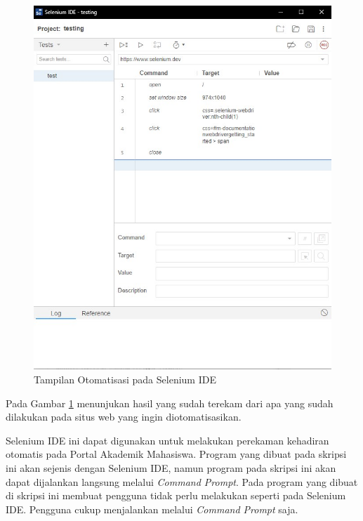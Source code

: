 \begin{enumerate}
\begin{figure}[H]
			\includegraphics[scale=0.5]{Gambar/testing.jpg}
			\caption{Tampilan Otomatisasi pada Selenium IDE} 
			\label{fig:testing}
		\end{figure}
		Pada Gambar \ref{fig:testing} menunjukan hasil yang sudah terekam dari apa yang sudah dilakukan pada situs web yang ingin diotomatisasikan.
	\end{enumerate}
Selenium IDE ini dapat digunakan untuk melakukan perekaman kehadiran otomatis pada Portal Akademik Mahasiswa. Program yang dibuat pada skripsi ini akan sejenis dengan Selenium IDE, namun program pada skripsi ini akan dapat dijalankan langsung melalui \textit{Command Prompt}. Pada program yang dibuat di skripsi ini membuat pengguna tidak perlu melakukan seperti pada Selenium IDE. Pengguna cukup menjalankan melalui \textit{Command Prompt} saja.